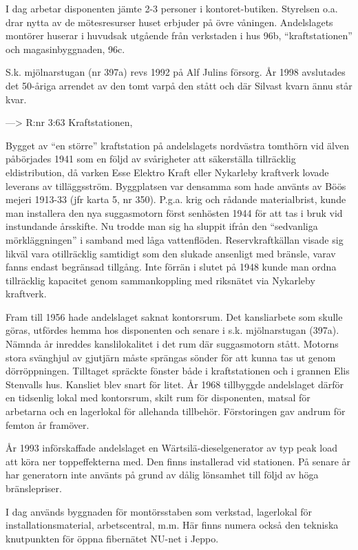 I dag arbetar disponenten jämte 2-3 personer i kontoret-butiken. Styrelsen o.a. drar nytta av de mötesresurser huset erbjuder på övre 	våningen. Andelslagets montörer huserar i huvudsak utgående från verkstaden i hus 96b, ``kraftstationen'' och magasinbyggnaden, 96c.

S.k. mjölnarstugan (nr 397a) revs 1992 på Alf Julins försorg. År 1998 avslutades det 50-åriga arrendet av den tomt varpå den stått och där Silvast kvarn ännu står kvar.

--->  R:nr 3:63	Kraftstationen,  

Bygget av ``en större'' kraftstation på andelslagets nordvästra tomthörn vid älven påbörjades 1941 som en följd av svårigheter att 	säkerställa tillräcklig eldistribution, då varken Esse Elektro Kraft eller Nykarleby kraftverk lovade leverans av tilläggsström. Byggplatsen var densamma som hade använts av Böös mejeri 1913-33 (jfr karta 5, nr 350). P.g.a. krig och rådande materialbrist, kunde man installera den nya suggasmotorn först senhösten 1944 för att tas i bruk vid instundande 	årsskifte. Nu trodde man sig ha sluppit ifrån den ``sedvanliga mörkläggningen'' i samband med låga vattenflöden. Reservkraftkällan visade sig likväl vara otillräcklig samtidigt som den slukade ansenligt med bränsle, varav fanns endast begränsad tillgång. Inte förrän i slutet på 1948 kunde man ordna tillräcklig kapacitet genom sammankoppling med riksnätet via Nykarleby kraftverk.


Fram till 1956 hade andelslaget saknat kontorsrum. Det kansliarbete som skulle göras, utfördes hemma hos disponenten och senare i s.k. 	mjölnarstugan (397a). Nämnda år inreddes kanslilokalitet i det rum där suggasmotorn stått. Motorns stora svänghjul av gjutjärn måste sprängas sönder för att kunna tas ut genom dörröppningen. Tilltaget spräckte fönster både i kraftstationen och i grannen Elis Stenvalls 	hus. Kansliet blev snart för litet. År 1968 tillbyggde andelslaget därför en tidsenlig lokal med kontorsrum, skilt rum för disponenten, matsal för arbetarna och en lagerlokal för allehanda tillbehör. Förstoringen gav andrum för femton år framöver.

År 1993 införskaffade andelslaget en Wärtsilä-dieselgenerator av typ peak load att köra ner toppeffekterna med. Den finns installerad vid 	stationen. På senare år har generatorn inte använts på grund av dålig lönsamhet till följd av höga bränslepriser.

I dag används byggnaden för montörsstaben som verkstad, lagerlokal 	för installationsmaterial, arbetscentral, m.m. Här finns numera också 	den tekniska knutpunkten för öppna fibernätet NU-net i Jeppo.

